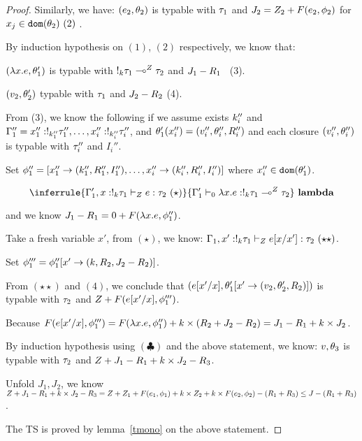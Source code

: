 \begin{proof}
   Similarly, we have: $(e_2, \theta_2)$ is  typable with $\tau_1$ and $J_2 = Z_2 + F(e_2, \phi_2)$ for $x_j \in \mathtt{dom}(\theta_2)~(2)$ .

   By induction hypothesis on $(1)$, $(2)$ respectively, we know that:
   
   $ ( \lambda x.e , \theta_1') $ is typable with $!_{k} \tau_1 \multimap^{Z} \tau_2$ and $J_1 - R_1$ ~(3). 
   
   $(v_2 , \theta_2')  $ typable with $ \tau_1 $ and $J_2 -R_2$ (4). 

   From (3), we know the following if we assume exists $k_i''$ and $\Gamma_1'' = x_1'' : !_{k_1''} \tau_1'', \ldots, x_i'' : !_{k_i''} \tau_i'' $, and $\theta_1'(x_i'') = (v_i'', \theta_i'', R_i'')$ and each closure $(v_i'', \theta_i'' )  $ is typable with $\tau_i''$ and $I_i''$.

 Set $\phi_1'' =[x_1'' \to (k_1'', R_1'', I_1'') , \ldots, x_i'' \to (k_i'', R_i'', I_i'')]$ where $x_i'' \in \mathtt{dom}(\theta_1')$.

   
   $$ \inferrule{
      \ictx \Gamma_1', x: \bang{\idx} \type_1
      \tvdash{\nnatA }
      \expr: \type_2 ~(\star)
    }{
      \ictx \Gamma_1' \tvdash{0} \lambda x. \expr : \bang{\idx} \type_1
      \lto{\nnatA} \type_2
    }~\textbf{lambda} $$

    and we know $J_1 - R_1 = 0 + F(  \lambda x. e , \phi_1'' )$.

    Take a fresh variable $x'$, from $(\star)$, we know: $ \Gamma_1, x': !_{k} \tau_1 \vdash_{Z }  e[x/x']: \tau_2 ~(\star\star) $.
    
   Set $\phi_1''' = \phi_1''[x' \to (k, R_2,  J_2-R_2 )]$.
    
   From $(\star\star)$ and $(4)$, we conclude that $( e[x'/x], \theta_1'[ x'  \to (v_2, \theta_2', R_2  ) ] )$ is typable with $\tau_2$ and $ Z+ F( e[x'/x], \phi_1''' )$.

Because  $ F( e[x'/x], \phi_1''' ) =   F(\lambda x.e, \phi_1'') +k \times (R_2 + J_2 -R_2 ) = J_1 - R_1 + k \times  J_2$.

    By induction hypothesis using $(\clubsuit)$ and the above statement, we know:
    $v, \theta_3$ is typable with $\tau_2$ and $Z + J_1 - R_1 +k \times  J_2 - R_3$.

    Unfold $J_1, J_2$, we know 
    $ Z + J_1 - R_1 +k \times  J_2 - R_3  = Z + Z_1 + F(e_1, \phi_1)  + k \times Z_2 + k \times F(e_2, \phi_2)  - (R_1 + R_3) \leq  J- (R_1+R_3) $.

    The TS is proved by lemma~\ref{tmono} on the above statement.
    
   
   \end{proof}  